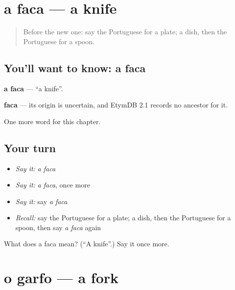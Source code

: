 \section[a faca]{a faca — a knife}

\label{lesson:PT-C51-faca}



\begin{quote}
Before the new one: say the Portuguese for a plate; a dish, then the Portuguese for a spoon.
\end{quote}

\subsection*{You'll want to know: a faca}
\textbf{a faca} — \textquotedblleft{}a knife\textquotedblright{}.

\begin{cousinweb}
\textbf{faca} — its origin is uncertain, and EtymDB 2.1 records no ancestor for it.
\end{cousinweb}

\begin{grammarlens}[title={What you've built}]
One more word for this chapter.
\end{grammarlens}

\subsection*{Your turn}
\begin{itemize}
\raggedright
  \item \emph{Say it:} \emph{a faca}
  \item \emph{Say it:} \emph{a faca}, once more
  \item \emph{Say it:} say \emph{a faca}
  \item \emph{Recall:} say the Portuguese for a plate; a dish, then the Portuguese for a spoon, then say \emph{a faca} again
\end{itemize}

\begin{tcolorbox}[breakable,colback=teal!4,colframe=teal!35!black,title={Before you move on}]
What does a faca mean? (\textquotedblleft{}A knife\textquotedblright{}.) Say it once more.
\end{tcolorbox}
\section[o garfo]{o garfo — a fork}

